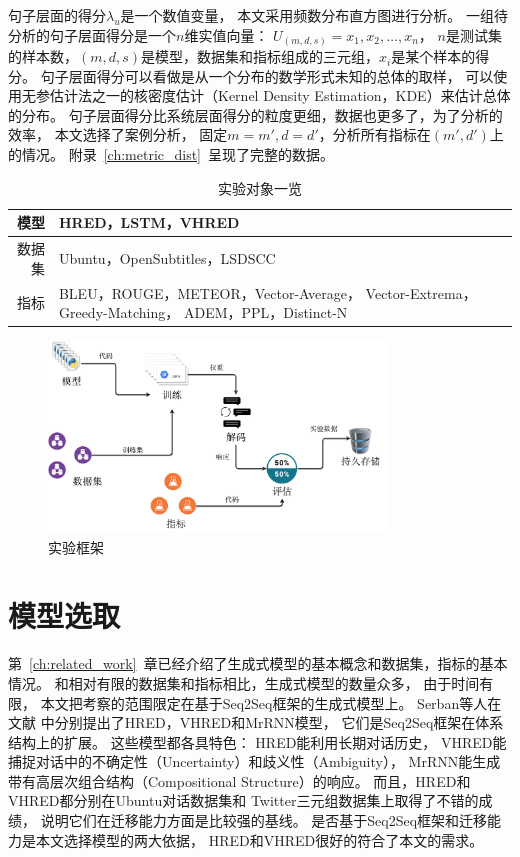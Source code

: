 句子层面的得分$\lambda_u$是一个数值变量，
本文采用频数分布直方图进行分析。
一组待分析的句子层面得分是一个$n$维实值向量： $U_{(m, d, s)} = x_1, x_2, \dots, x_n$，
$n$是测试集的样本数，$(m, d, s)$是模型，数据集和指标组成的三元组，$x_i$是某个样本的得分。
句子层面得分可以看做是从一个分布的数学形式未知的总体的取样，
可以使用无参估计法之一的核密度估计（Kernel Density Estimation，KDE）来估计总体的分布。
句子层面得分比系统层面得分的粒度更细，数据也更多了，为了分析的效率，
本文选择了案例分析，
固定$m = m', d = d'$，分析所有指标在$(m', d')$上的情况。
附录~\ref{ch:metric_dist}~呈现了完整的数据。

\begin{table}[H]
    \centering
    \caption{实验对象一览}
    \label{tab:experiment_triples}
    \begin{tabular}{|r|m{}|}
        \hline
        模型 & HRED，LSTM，VHRED \\
        \hline
        数据集 & Ubuntu，OpenSubtitles，LSDSCC \\
        \hline
        指标 & BLEU，ROUGE，METEOR，Vector-Average，
        Vector-Extrema，Greedy-Matching，
        ADEM，PPL，Distinct-N \\
        \hline
    \end{tabular}
\end{table}

\begin{figure}[H]
    \centering
    \includegraphics[width=0.8\textwidth]{figure/drawio/eval_v4.pdf}
    \caption{实验框架}
    \label{fig:framework}
\end{figure}

\section{模型选取}\label{sec:model_selection}
第~\ref{ch:related_work}~章已经介绍了生成式模型的基本概念和数据集，指标的基本情况。
和相对有限的数据集和指标相比，生成式模型的数量众多，
由于时间有限，
本文把考察的范围限定在基于Seq2Seq框架的生成式模型上。
Serban等人在文献\cite{HRED,VHRED,MrRNN}
中分别提出了HRED，VHRED和MrRNN模型，
它们是Seq2Seq框架在体系结构上的扩展。
这些模型都各具特色：
HRED能利用长期对话历史，
VHRED能捕捉对话中的不确定性（Uncertainty）和歧义性（Ambiguity），
MrRNN能生成带有高层次组合结构（Compositional Structure）的响应。
而且，HRED和VHRED都分别在Ubuntu对话数据集和
Twitter三元组数据集上取得了不错的成绩，
说明它们在迁移能力方面是比较强的基线。
是否基于Seq2Seq框架和迁移能力是本文选择模型的两大依据，
HRED和VHRED很好的符合了本文的需求。

